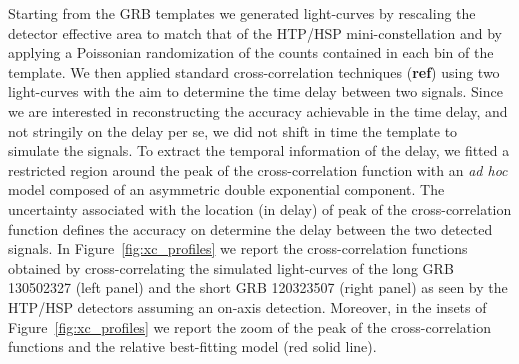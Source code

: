 \documentclass[]{spie}  %
\begin{document}
Starting from the GRB templates we generated light-curves by rescaling the detector effective area to match that of the HTP/HSP mini-constellation and by applying a Poissonian randomization of the counts contained in each bin of the template. We then applied standard cross-correlation techniques (\textbf{ref}) using two light-curves with the aim to determine the time delay between two signals. Since we are interested in reconstructing the accuracy achievable in the time delay, and not stringily on the delay per se, we did not shift in time the template to simulate the signals. To extract the temporal information of the delay, we fitted a restricted region around the peak of the cross-correlation function with an \emph{ad hoc} model composed of an asymmetric double exponential component. The uncertainty associated with the location (in delay) of peak of the cross-correlation function defines the accuracy on determine the delay between the two detected signals. In Figure~\ref{fig:xc_profiles} we report the cross-correlation functions obtained by cross-correlating the simulated light-curves of the long GRB 130502327 (left panel) and the short GRB 120323507 (right panel) as seen by the HTP/HSP detectors assuming an on-axis detection. Moreover, in the insets of Figure~\autoref{fig:xc_profiles} we report the zoom of the peak of the cross-correlation functions and the relative best-fitting model (red solid line).
	
\end{document}
